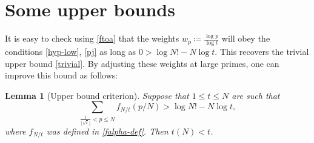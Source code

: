 \documentclass[12pt,a4paper,reqno]{amsart}
\numberwithin{equation}{section}
\theoremstyle{plain}
\newtheorem{lemma}[theorem]{Lemma}
\theoremstyle{definition}
\begin{document}
\FloatBarrier

\section{Some upper bounds}\label{upper-sec}

It is easy to check using \eqref{ftoa} that the weights $w_p \coloneqq \frac{\log p}{\log t}$ will obey the conditions \eqref{hyp-low}, \eqref{pj} as long as $0 > \log N! - N \log t$.  This recovers the trivial upper bound \eqref{trivial}.  By adjusting these weights at large primes, one can improve this bound as follows:

\begin{lemma}[Upper bound criterion]\label{upper-crit}  Suppose that $1 \leq t \leq N$ are such that
  \begin{equation}\label{contra}
     \sum_{\frac{t}{\lfloor\sqrt{t}\rfloor} < p \leq N} f_{N/t}(p/N) > \log N! - N \log t,
  \end{equation}
  where $f_{N/t}$ was defined in \eqref{falpha-def}.
  Then $t(N) < t$.
  \end{lemma}
\end{document}
